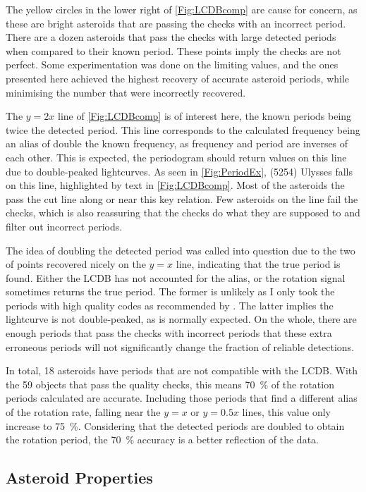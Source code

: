 \documentclass{UCreport}
\begin{document}
The yellow circles in the lower right of \autoref{Fig:LCDBcomp} are cause for concern, as these are bright asteroids that are passing the checks with an incorrect period.
There are a dozen asteroids that pass the checks with large detected periods when compared to their known period.
These points imply the checks are not perfect.
Some experimentation was done on the limiting values, and the ones presented here achieved the highest recovery of accurate asteroid periods, while minimising the number that were incorrectly recovered.

The $y=2x$ line of \autoref{Fig:LCDBcomp} is of interest here, the known periods being twice the detected period.
This line corresponds to the calculated frequency being an alias of double the known frequency, as frequency and period are inverses of each other.
This is expected, the periodogram should return values on this line due to double-peaked lightcurves.
As seen in \autoref{Fig:PeriodEx}, (5254) Ulysses falls on this line, highlighted by text in \autoref{Fig:LCDBcomp}.
Most of the asteroids the pass the cut line along or near this key relation.
Few asteroids on the line fail the checks, which is also reassuring that the checks do what they are supposed to and filter out incorrect periods.

The idea of doubling the detected period was called into question due to the two of points recovered nicely on the $y=x$ line, indicating that the true period is found.
Either the LCDB has not accounted for the alias,  or the rotation signal sometimes returns the true period.
The former is unlikely as I only took the periods with high quality codes as recommended by \citet{Warner2009}.
The latter implies the lightcurve is not double-peaked, as is normally expected.
On the whole, there are enough periods that pass the checks with incorrect periods that these extra erroneous periods will not significantly change the fraction of reliable detections.

In total, 18 asteroids have periods that are not compatible with the LCDB.
With the 59 objects that pass the quality checks, this means \qty{70}{\percent} of the rotation periods calculated are accurate.
Including those periods that find a different alias of the rotation rate, falling near the $y=x$ or $y=0.5x$ lines, this value only increase to \qty{75}{\percent}. 
Considering that the detected periods are doubled to obtain the rotation period, the \qty{70}{\percent} accuracy is a better reflection of the data.  


\subsection{Asteroid Properties}\label{SubSec:AstPropRes} %
\end{document}
